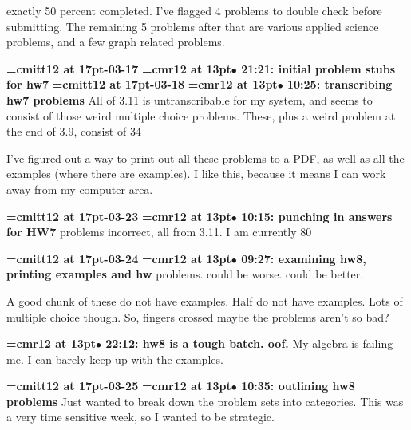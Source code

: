 exactly 50 percent completed. I've flagged 4 problems to double check before submitting. The remaining 5 problems after that are various applied science problems, and a few graph related problems.
\par

{\medskip\noindent\bf\font\titlefont=cmitt12 at 17pt-03-17}\medskip
{\smallskip\noindent\bf\font\titlefont=cmr12 at 13pt\titlefont $\bullet$ 21:21: initial problem stubs for hw7}\smallskip
{\medskip\noindent\bf\font\titlefont=cmitt12 at 17pt-03-18}\medskip
{\smallskip\noindent\bf\font\titlefont=cmr12 at 13pt\titlefont $\bullet$ 10:25: transcribing hw7 problems}\smallskip
All of 3.11 is untranscribable for my system, and seems to consist of those weird multiple choice problems. These, plus a weird problem at the end of 3.9, consist of 34%
\par

I've figured out a way to print out all these problems to a PDF, as well as all the examples (where there are examples). I like this, because it means I can work away from my computer area.
\par

{\medskip\noindent\bf\font\titlefont=cmitt12 at 17pt-03-23}\medskip
{\smallskip\noindent\bf\font\titlefont=cmr12 at 13pt\titlefont $\bullet$ 10:15: punching in answers for HW7} problems incorrect, all from 3.11. I am currently 80%
\par

{\medskip\noindent\bf\font\titlefont=cmitt12 at 17pt-03-24}\medskip
{\smallskip\noindent\bf\font\titlefont=cmr12 at 13pt\titlefont $\bullet$ 09:27: examining hw8, printing examples and hw} problems. could be worse. could be better.
\par

A good chunk of these do not have examples. Half do not have examples. Lots of multiple choice though. So, fingers crossed maybe the problems aren't so bad?
\par

{\smallskip\noindent\bf\font\titlefont=cmr12 at 13pt\titlefont $\bullet$ 22:12: hw8 is a tough batch. oof.}\smallskip
My algebra is failing me. I can barely keep up with the examples.
\par

{\medskip\noindent\bf\font\titlefont=cmitt12 at 17pt-03-25}\medskip
{\smallskip\noindent\bf\font\titlefont=cmr12 at 13pt\titlefont $\bullet$ 10:35: outlining hw8 problems}\smallskip
Just wanted to break down the problem sets into categories. This was a very time sensitive week, so I wanted to be strategic.
\par

